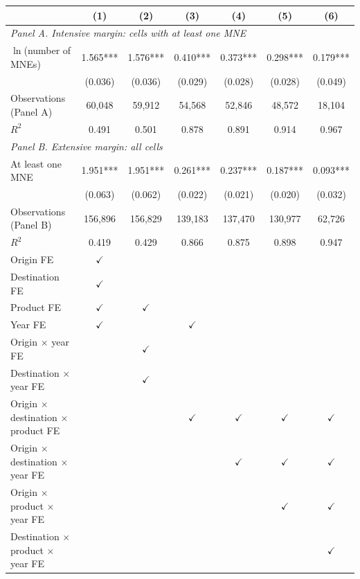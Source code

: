 \begin{tabular}{l*{6}{c}}
\toprule
 & (1) & (2) & (3) & (4) & (5) & (6) \\
\midrule
\multicolumn{7}{l}{\textit{Panel A. Intensive margin: cells with at least one MNE}} \\
$\ln$(number of MNEs) & 1.565*** & 1.576*** & 0.410*** & 0.373*** & 0.298*** & 0.179*** \\
 & (0.036) & (0.036) & (0.029) & (0.028) & (0.028) & (0.049) \\
Observations (Panel A) & 60,048 & 59,912 & 54,568 & 52,846 & 48,572 & 18,104 \\
$R^2$ & 0.491 & 0.501 & 0.878 & 0.891 & 0.914 & 0.967 \\
\midrule
\multicolumn{7}{l}{\textit{Panel B. Extensive margin: all cells}} \\
At least one MNE & 1.951*** & 1.951*** & 0.261*** & 0.237*** & 0.187*** & 0.093*** \\
 & (0.063) & (0.062) & (0.022) & (0.021) & (0.020) & (0.032) \\
Observations (Panel B) & 156,896 & 156,829 & 139,183 & 137,470 & 130,977 & 62,726 \\
$R^2$ & 0.419 & 0.429 & 0.866 & 0.875 & 0.898 & 0.947 \\
\midrule
Origin FE & $\checkmark$ &  &  &  &  &  \\
Destination FE & $\checkmark$ &  &  &  &  &  \\
Product FE & $\checkmark$ & $\checkmark$ &  &  &  &  \\
Year FE & $\checkmark$ &  & $\checkmark$ &  &  &  \\
Origin $\times$ year FE &  & $\checkmark$ &  &  &  &  \\
Destination $\times$ year FE &  & $\checkmark$ &  &  &  &  \\
Origin $\times$ destination $\times$ product FE &  &  & $\checkmark$ & $\checkmark$ & $\checkmark$ & $\checkmark$ \\
Origin $\times$ destination $\times$ year FE &  &  &  & $\checkmark$ & $\checkmark$ & $\checkmark$ \\
Origin $\times$ product $\times$ year FE &  &  &  &  & $\checkmark$ & $\checkmark$ \\
Destination $\times$ product $\times$ year FE &  &  &  &  &  & $\checkmark$ \\
\bottomrule
\end{tabular}
